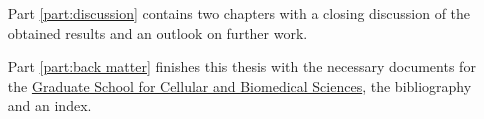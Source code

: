 \begin{itemize}
\begin{itemize}
	\end{itemize}
	\item [Part \ref{part:discussion}] contains two chapters with a closing discussion of the obtained results and an outlook on further work.
	\item [Part \ref{part:back matter}] finishes this thesis with the necessary documents for the \href{http://www.gcb.unibe.ch}{Graduate School for Cellular and Biomedical Sciences}, the bibliography and an index.
\end{itemize}